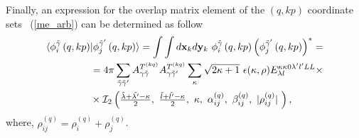 \documentclass[
12pt, %
oneside, %
english, %
onehalfspacing, %
onehalfspacing, %
headsepline, %
]{MastersDoctoralThesis} %
\begin{document}
  Finally, an expression for the overlap matrix element of the $(q,kp)$ coordinate sets ~(\ref{me_arb}) can be determined as follow
\begin{align}
\langle \phi_{i}^{\tilde{\gamma}}\left(q,kp \right) & \vert 
\phi_{j}^{\tilde{\gamma}^{\prime}}\left(q,kp \right) \rangle =
\int \int d{\bf x}_k d{\bf y}_k  ~\phi_{i}^{\tilde{\gamma}}\left(q,kp \right) \left( \phi_{j}^{\tilde{\gamma}^{\prime}}\left(q,kp \right) \right)^{*}  = \nonumber 
\\ & = 4 \pi \sum_{\tilde{\gamma}\tilde{\gamma}^{\prime}}  A_{\gamma\tilde{\gamma}}^{ T^{(kq)} } A_{\gamma\tilde{\gamma}^{\prime}}^{ T^{(kq)} }
 \sum_{\kappa} \sqrt{2\kappa+1}~ \epsilon(\kappa, \rho) {E}^{\kappa \kappa 0 \lambda^{\prime} l^{\prime} L L}_{\lambda l} \times  \nonumber \\
 &\times \mathcal{I}_2\left(
 \tfrac{\tilde{\lambda}+\tilde{\lambda^{\prime}}-\kappa}{2}, ~
 \tfrac{\tilde{l}+\tilde{l^{\prime}}-\kappa}{2},~
 \kappa,~
 \alpha^{(q)}_{ij},~
 \beta^{(q)}_{ij} ,~
 \vert \rho^{(q)}_{ij} \vert ~
  \right),
\end{align}
where, $\rho_{ij}^{(q)}=\rho_{i}^{(q)}+\rho_{j}^{(q)}$.
\end{document}
